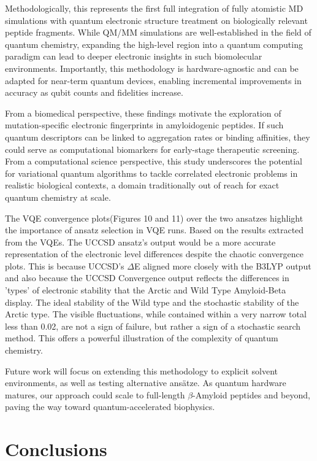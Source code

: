 \documentclass[pdflatex,sn-mathphys-num]{sn-jnl}%
\theoremstyle{thmstyleone}%
\theoremstyle{thmstyletwo}%
\theoremstyle{thmstylethree}%
\begin{document}
Methodologically, this represents the first full integration of fully atomistic MD simulations with quantum electronic structure treatment on biologically relevant peptide fragments. While QM/MM simulations are well-established in the field of quantum chemistry, expanding the high-level region into a quantum computing paradigm can lead to deeper electronic insights in such biomolecular environments. Importantly, this methodology is hardware-agnostic and can be adapted for near-term quantum devices, enabling incremental improvements in accuracy as qubit counts and fidelities increase.

From a biomedical perspective, these findings motivate the exploration of mutation-specific electronic fingerprints in amyloidogenic peptides. If such quantum descriptors can be linked to aggregation rates or binding affinities, they could serve as computational biomarkers for early-stage therapeutic screening. From a computational science perspective, this study underscores the potential for variational quantum algorithms to tackle correlated electronic problems in realistic biological contexts, a domain traditionally out of reach for exact quantum chemistry at scale.

The VQE convergence plots(Figures 10 and 11) over the two ansatzes highlight the importance of ansatz selection in VQE runs. Based on the results extracted from the VQEs. The UCCSD ansatz's output would be a more accurate representation of the electronic level differences despite the chaotic convergence plots. This is because UCCSD's $\Delta$E aligned more closely with the  B3LYP output and also because the UCCSD Convergence output reflects the differences in 'types' of electronic stability that the Arctic and Wild Type Amyloid-Beta display. The ideal stability of the Wild type and the stochastic stability of the Arctic type. The visible fluctuations, while contained within a very narrow total less than 0.02, are not a sign of failure, but rather a sign of a stochastic search method. This offers a powerful illustration of the complexity of quantum chemistry. 

Future work will focus on extending this methodology to explicit solvent environments, as well as testing alternative ansätze. As quantum hardware matures, our approach could scale to full-length $\beta$-Amyloid peptides and beyond, paving the way toward quantum-accelerated biophysics.


\section{Conclusions}\label{sec4}
\end{document}
